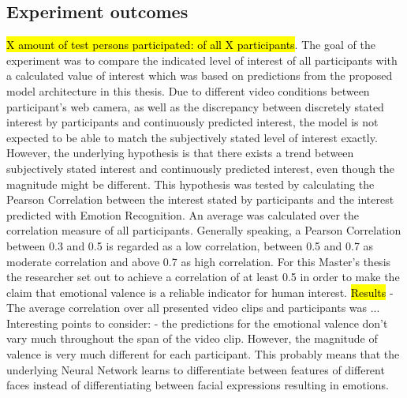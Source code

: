 \subsection{Experiment outcomes}
\hl{X amount of test persons participated:  of all X participants}.
The goal of the experiment was to compare the indicated level of interest of all participants with a calculated value of interest which was based on predictions from the proposed model architecture in this thesis.
\newline\newline
Due to different video conditions between participant's web camera, as well as the discrepancy between discretely stated interest by participants and continuously predicted interest, the model is not expected to be able to match the subjectively stated level of interest exactly. However, the underlying hypothesis is that there exists a trend between subjectively stated interest and continuously predicted interest, even though the magnitude might be different.
\newline\newline
This hypothesis was tested by calculating the Pearson Correlation between the interest stated by participants and the interest predicted with Emotion Recognition. An average was calculated over the correlation measure of all participants. 
\newline\newline
Generally speaking, a Pearson Correlation between 0.3 and 0.5 is regarded as a low correlation, between 0.5 and 0.7 as moderate correlation and above 0.7 as high correlation. For this Master's thesis the researcher set out to achieve a correlation of at least 0.5 in order to make the claim that emotional valence is a reliable indicator for human interest.
\newline\newline
\hl{Results}\newline
- The average correlation over all presented video clips and participants was ...
\newline
Interesting points to consider:
- the predictions for the emotional valence don't vary much throughout the span of the video clip. However, the magnitude of valence is very much different for each participant. This probably means that the underlying Neural Network learns to differentiate between features of different faces instead of differentiating between facial expressions resulting in emotions.



